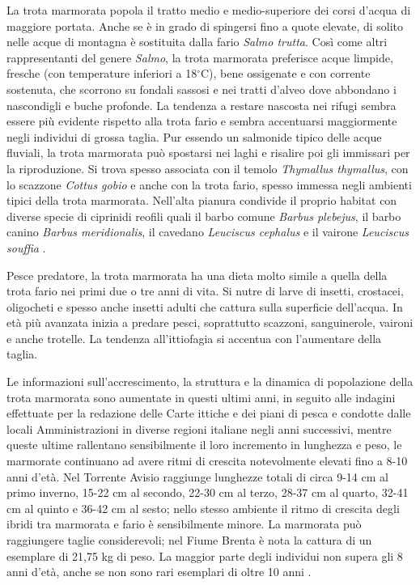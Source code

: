 \documentclass[10pt,twoside,openany,x11names,svgnames,italian,a5paper,dvipsnames,table]{memoir}
\begin{document}
La trota marmorata popola il tratto medio e medio-superiore dei corsi d'acqua di maggiore portata. Anche se è in grado di spingersi fino a quote elevate, di solito nelle acque di montagna è sostituita dalla fario \emph{Salmo trutta}. Così come altri rappresentanti del genere \emph{Salmo}, la trota marmorata preferisce acque limpide, fresche (con temperature inferiori a 18$^\circ$C), bene ossigenate e con corrente sostenuta, che scorrono su fondali sassosi e nei tratti d’alveo dove abbondano i nascondigli e buche profonde. La tendenza a restare nascosta nei rifugi sembra essere più evidente rispetto alla trota fario e sembra accentuarsi maggiormente negli individui di grossa taglia. Pur essendo un salmonide tipico delle acque fluviali, la trota marmorata può spostarsi nei laghi e risalire poi gli immissari per la riproduzione. Si trova spesso associata con il temolo \emph{Thymallus thymallus}, con lo scazzone \emph{Cottus gobio} e anche con la trota fario, spesso immessa negli ambienti tipici della trota marmorata. Nell'alta pianura condivide il proprio habitat con diverse specie di ciprinidi reofili quali il barbo comune \emph{Barbus plebejus}, il barbo canino \emph{Barbus meridionalis}, il cavedano \emph{Leuciscus cephalus} e il vairone \emph{Leuciscus souffia} \cite{Tortonese}.

Pesce predatore, la trota marmorata ha una dieta molto simile a quella della trota fario nei primi due o tre anni di vita. Si nutre di larve di insetti, crostacei, oligocheti e spesso anche insetti adulti che cattura sulla superficie dell'acqua. In età più avanzata inizia a predare pesci, soprattutto scazzoni, sanguinerole, vaironi e anche trotelle. La tendenza all'ittiofagia si accentua con l'aumentare della taglia. 

Le informazioni sull'accrescimento, la struttura e la dinamica di popolazione della trota marmorata sono aumentate in questi ultimi anni, in seguito alle indagini effettuate per la redazione delle Carte ittiche e dei piani di pesca e condotte dalle locali Amministrazioni in diverse regioni italiane negli anni successivi, mentre queste ultime rallentano sensibilmente il loro incremento in lunghezza e peso, le marmorate continuano ad avere ritmi di crescita notevolmente elevati fino a 8-10 anni d'età. Nel Torrente Avisio raggiunge lunghezze totali di circa 9-14 cm al primo inverno, 15-22 cm al secondo, 22-30 cm al terzo, 28-37 cm al quarto, 32-41 cm al quinto e 36-42 cm al sesto; nello stesso ambiente il ritmo di crescita degli ibridi tra marmorata e fario è sensibilmente minore. La marmorata può raggiungere taglie considerevoli; nel Fiume Brenta è nota la cattura di un esemplare di 21,75 kg di peso. La maggior parte degli individui non supera gli 8 anni d'età, anche se non sono rari esemplari di oltre 10 anni \cite{Gandolfi91}.
\end{document}
